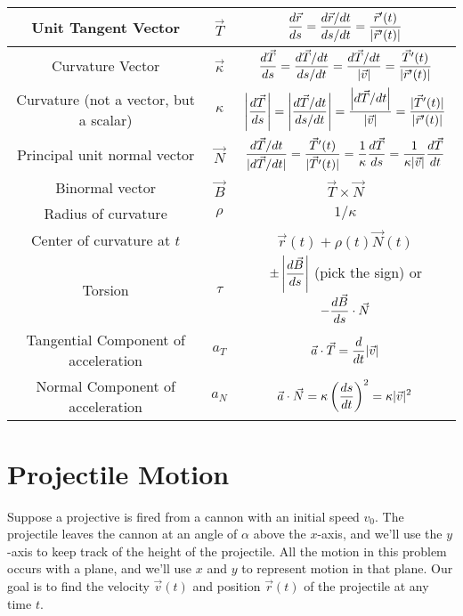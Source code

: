 \begin{center}
\begin{tabular}{|c|c|c|}
\hline
Unit Tangent Vector & $\vec T$ & $\displaystyle\frac{d\vec r}{ds} = \frac{d\vec r/dt}{ds/dt} = \frac{\vec r^\prime(t)}{|\vec r^\prime(t)|}$\\\hline
Curvature Vector & $\vec \kappa $& $\displaystyle\frac{d\vec T}{ds} =\frac{d\vec T/dt}{ds/dt} = \frac{d\vec T/dt}{|\vec v|} = \frac{\vec T^\prime(t)}{|\vec r^\prime(t)|} $\\\hline
Curvature (not a vector, but a scalar)& $ \kappa $&$\displaystyle \left|\frac{d\vec T}{ds}\right| =\left|\frac{d\vec T/dt}{ds/dt}\right| = \frac{\left|d\vec T/dt\right|}{|\vec v|}= \frac{|\vec T^\prime(t)|}{|\vec r^\prime(t)|}  $ \\\hline
Principal unit normal vector & $ \vec N$& $\displaystyle \frac{d\vec T/dt}{|d\vec T/dt|} =  \frac{\vec T^\prime(t)}{|\vec T^\prime(t)|}=\frac{1}{\kappa}\frac{d\vec T}{ds} = \frac{1}{\kappa |\vec v|}\frac{d\vec T}{dt}$\\\hline
Binormal vector & $ \vec B$& $ \vec T\times\vec N$\\\hline
Radius of curvature & $ \rho$ & $1/\kappa$\\\hline
Center of curvature at $t$&  & $\vec r(t)+\rho(t)\vec N(t)$ \\\hline
Torsion & $ \tau $ & $\displaystyle \pm\left|\frac{d\vec B}{ds}\right|$ (pick the sign) or $\displaystyle-\frac{d\vec B}{ds}\cdot \vec N $\\\hline
Tangential Component of acceleration & $ a_T$ & $\displaystyle \vec a \cdot \vec T = \frac{d}{dt}|\vec v|$\\\hline
Normal Component of acceleration & $ a_N$ & $\displaystyle \vec a \cdot \vec N = \kappa \left(\frac{ds}{dt}\right)^2 = \kappa |\vec v|^2$\\\hline
\end{tabular}
\end{center}


\section{Projectile Motion}

Suppose a projective is fired from a cannon with an initial speed $v_0$. The projectile leaves the cannon at an angle of $\alpha$ above the $x$-axis, and we'll use the $y$-axis to keep track of the height of the projectile.  All the motion in this problem occurs with a plane, and we'll use $x$ and $y$ to represent motion in that plane. Our goal is to find the velocity $\vec v(t)$ and position $\vec r(t)$  of the projectile at any time $t$. 

